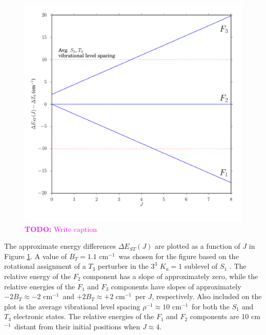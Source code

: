 \documentclass[12pt]{mitthesis}
\newcommand{\TODO} [1]{\textcolor{magenta}{\textbf{TODO:} #1}}
\newcommand{\rcm}{cm$^{-1}$}
\newcommand{\Ka}[1]{$K_a\!\!=\!#1$}
\begin{document}
\begin{figure}
  \caption{\TODO{Write caption} }
  \label{fig:rotational-energy-differences}
  \centering
  \includegraphics[width=6in]{rotational-energy-differences.pdf}
\end{figure}

The approximate energy differences $\Delta E_{ST}(J)$ are plotted as a
function of $J$ in Figure \ref{fig:rotational-energy-differences}.  A
value of $B_T=1.1$ \rcm\ was chosen for the figure based on the
rotational assignment of a $T_3$ perturber in the $3^3$ \Ka{1}
sublevel of $S_1$ \cite{mishra04}.  The relative energy of the $F_2$
component has a slope of approximately zero, while the relative
energies of the $F_1$ and $F_3$ components have slopes of
approximately $-2B_T \approx -2$ \rcm\ and $+2B_T \approx +2$ \rcm\
per $J$, respectively.  Also included on the plot is the average
vibrational level spacing $\rho^{-1} \approx 10$ \rcm\ for both the
$S_1$ and $T_3$ electronic states.  The relative energies of the $F_1$
and $F_2$ components are 10 \rcm\ distant from their initial positions
when $J \approx 4$.
\end{document}
